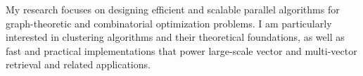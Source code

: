 My research focuses on designing efficient and scalable parallel algorithms for graph-theoretic and combinatorial optimization problems. I am particularly interested in clustering algorithms and their theoretical foundations, as well as fast and practical implementations that power large-scale vector and multi-vector retrieval and related applications.